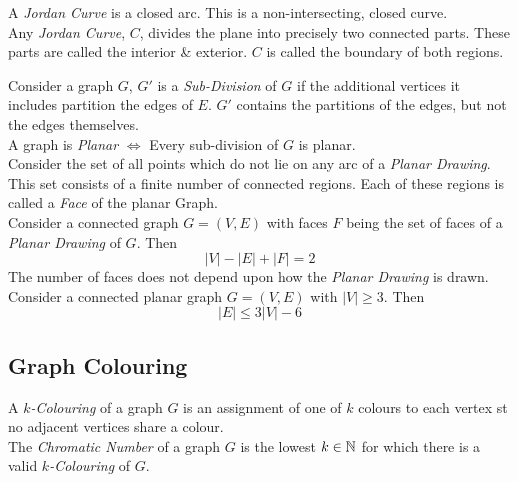 \documentclass[11pt,a4paper]{article}
\begin{document}
A \textit{Jordan Curve} is a closed arc. This is a non-intersecting, closed curve.\\

Any \textit{Jordan Curve}, $C$, divides the plane into precisely two connected parts. These parts are called the interior \& exterior. $C$ is called the boundary of both regions.\\


Consider a graph $G$, $G'$ is a \textit{Sub-Division} of $G$ if the additional vertices it includes partition the edges of $E$. $G'$ contains the partitions of the edges, but not the edges themselves.\\

A graph is \textit{Planar} $\Leftrightarrow$ Every sub-division of $G$ is planar.\\

Consider the set of all points which do not lie on any arc of a \textit{Planar Drawing}. This set consists of a finite number of connected regions. Each of these regions is called a \textit{Face} of the planar Graph.\\

Consider a connected graph $G=(V,E)$ with faces $F$ being the set of faces of a \textit{Planar Drawing} of $G$. Then
$$|V|-|E|+|F|=2$$
\NB The number of faces does not depend upon how the \textit{Planar Drawing} is drawn.\\

Consider a connected planar graph $G=(V,E)$ with $|V|\geq3$. Then
$$|E|\leq3|V|-6$$

\subsection{Graph Colouring}

A \textit{$k$-Colouring} of a graph $G$ is an assignment of one of $k$ colours to each vertex st no adjacent vertices share a colour.\\

The \textit{Chromatic Number} of a graph $G$ is the lowest $k\in\mathbb{N}$ for which there is a valid \textit{$k$-Colouring} of $G$.\\
\end{document}
